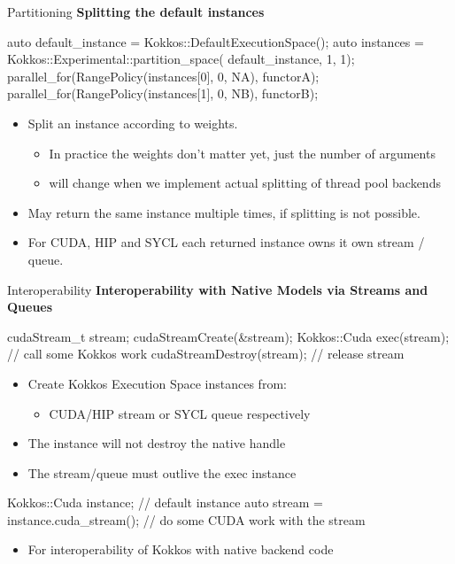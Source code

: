 \begin{frame}[fragile]{Partitioning}
\textbf{Splitting the default instances}
\begin{code}
auto default_instance = Kokkos::DefaultExecutionSpace();
auto instances = Kokkos::Experimental::partition_space(
                   default_instance, 1, 1);
parallel_for(RangePolicy(instances[0], 0, NA), functorA);
parallel_for(RangePolicy(instances[1], 0, NB), functorB);
\end{code}
\begin{itemize}
\item { Split an instance according to weights.
  \begin{itemize}
     \item In practice the weights don't matter yet, just the number of arguments
     \item will change when we implement actual splitting of thread pool backends
  \end{itemize}
}
\item { May return the same instance multiple times, if splitting is not possible. }
\item { For CUDA, HIP and SYCL each returned instance owns it own stream / queue. }
\end{itemize}
\end{frame}


\begin{frame}[fragile]{Interoperability}
\textbf{Interoperability with Native Models via Streams and Queues}
\begin{code}
  cudaStream_t stream;
  cudaStreamCreate(&stream);
  {
    Kokkos::Cuda exec(stream);
    // call some Kokkos work
  }
  cudaStreamDestroy(stream); // release stream
\end{code}
\begin{itemize}
\item Create Kokkos Execution Space instances from:
\begin{itemize}
   \item CUDA/HIP stream or SYCL queue respectively
\end{itemize}
\item The instance will not destroy the native handle
\item The stream/queue must outlive the exec instance
\end{itemize}

\begin{code}
   Kokkos::Cuda instance; // default instance
   auto stream = instance.cuda_stream();
   // do some CUDA work with the stream
\end{code}
\begin{itemize}
  \item For interoperability of Kokkos with native backend code
\end{itemize}
\end{frame}

